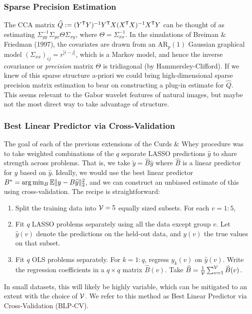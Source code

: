 \documentclass[main]{subfiles}
\begin{document}
\subsubsection{Sparse Precision Estimation}
The CCA matrix $\widehat{Q} := (Y^\mathsf T Y)^{-1}Y^\mathsf T X (X^\mathsf T X)^{-1}  X^\mathsf T Y$ can be thought of as estimating $\Sigma_{yy}^{-1}\Sigma_{yx}\Theta\Sigma_{xy}$, where $\Theta = \Sigma_{xx}^{-1}$. In the simulations of Breiman \& Friedman (1997), the covariates are drawn from an $\text{AR}_p(1)$ Gaussian graphical model $(\Sigma_{xx})_{ij} = r^{|i-j|}$, which is a Markov model, and hence the inverse covariance or {\sl precision} matrix $\Theta$ is tridiagonal (by Hammersley-Clifford). If we knew of this sparse structure a-priori we could bring high-dimensional sparse precision matrix estimation to bear on constructing a plug-in estimate for $\widehat{Q}$. This seems relevant to the Gabor wavelet features of natural images, but maybe not the most direct way to take advantage of structure. \newpage

\subsubsection{Best Linear Predictor via Cross-Validation}

The goal of each of the previous extensions of the Curds \& Whey procedure was to take weighted combinations of the $q$ separate LASSO predictions $\widehat{y}$ to share strength across problems. That is, we take $\widetilde{y} = \widehat{B}\widehat{y}$ where $\widehat{B}$ is a linear predictor for $y$ based on $\widehat{y}$. Ideally, we would use the best linear predictor $B^* = \arg\min_B\mathbb{E}\|y-B\widehat{y}\|_2^2$, and we can construct an unbiased estimate of this using cross-validation. The recipe is straightforward:
\begin{enumerate}
\item Split the training data into $\mathcal{V}=5$ equally sized subsets. For each $v=1:5$,
\item Fit $q$ LASSO problems separately using all the data except group $v$. Let $\widehat{y}(v)$ denote the predictions on the held-out data, and $y(v)$ the true values on that subset.
\item Fit $q$ OLS problems separately. For $k=1:q$, regress $y_k(v)$ on $\widehat{y}(v)$. Write the regression coefficients in a $q\times q$ matrix $\widehat{B}(v)$. Take $\widehat{B} = \frac{1}{\mathcal{V}}\sum_{v=1}^{\mathcal{V}} \widehat{B}(v)$. 
\end{enumerate}
In small datasets, this will likely be highly variable, which can be mitigated to an extent with the choice of $\mathcal{V}$. We refer to this method as Best Linear Predictor via Cross-Validation (BLP-CV).
\end{document}
